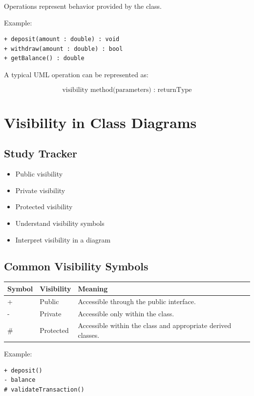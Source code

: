 \documentclass[11pt,a4paper]{article}
\newcommand{\checkitem}{$\square$}
\begin{document}
Operations represent behavior provided by the class.

Example:

\begin{verbatim}
+ deposit(amount : double) : void
+ withdraw(amount : double) : bool
+ getBalance() : double
\end{verbatim}

A typical UML operation can be represented as:

\[
\text{visibility method(parameters) : returnType}
\]

\section{Visibility in Class Diagrams}

\subsection{Study Tracker}

\begin{itemize}[label=\checkitem]
    \item Public visibility
    \item Private visibility
    \item Protected visibility
    \item Understand visibility symbols
    \item Interpret visibility in a diagram
\end{itemize}

\subsection{Common Visibility Symbols}

\begin{tabularx}{\textwidth}{|p{}|p{}|X|}
\hline
\textbf{Symbol} & \textbf{Visibility} & \textbf{Meaning}\\
\hline
+ & Public & Accessible through the public interface.\\
\hline
- & Private & Accessible only within the class.\\
\hline
\# & Protected & Accessible within the class and appropriate derived classes.\\
\hline
\end{tabularx}

Example:

\begin{verbatim}
+ deposit()
- balance
# validateTransaction()
\end{verbatim}
\end{document}
